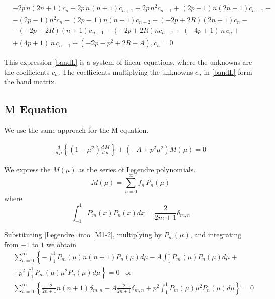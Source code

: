 \begin{equation}\label{bandL}
\begin{split}
& -2p\,n(2n+1)c_n  + 2p\,n(n+1)c_{n+1}+2p\,n^2c_{n-1} + (2p-1)n(2n-1)c_{n-1}-  \\[.8em]
& - (2p-1)n^2c_n-(2p-1)n(n-1)c_{n-2} +(-2p+2R)(2n+1)c_n - \\[.8em]
& - (-2p+2R)(n+1)c_{n+1} - (-2p+2R)n c_{n-1} + (-4p + 1)\,n\,c_n +  \\[.8em]
&  + (4p+1)\,n\,c_{n-1} + (-2p - p^2 + 2R + A),c_ n = 0 
\end{split} 
\end{equation}

This expression \eqref{bandL} is  a system of linear equations, where the unknowns are the coefficients $ c_n $. The coefficients multiplying the unknowns $ c_n $ in \eqref{bandL} form the band matrix.


\subsection{M  Equation}

We use the same approach for the M equation.

\begin{equation}\label{M1-2}
\begin{split}
\frac{d}{d\,\mu}\left\{\left(1 - \mu^2\right)\frac{d\,M}{d\,\mu} \right\}  + \left( - A + p^2\mu^2   \right)M(\mu) = 0
\end{split}
\end{equation}

We express the $ M(\mu) $ as the series of Legendre polynomials.
\begin{equation}\label{Legendre}
M(\mu) = \sum_{n=0}^{\infty}{f_n\,P_n(\mu)}
\end{equation}
where 
\begin{equation}\label{LInt}
\int_{-1}^{1}{P_m(x)P_n(x)dx} = \frac{2}{2m+1}\delta_{m,n}
\end{equation}

Substituting \eqref{Legendre} into \eqref{M1-2}, multiplying by $ P_m(\mu) $, and integrating from $ -1 $ to $ 1 $ we obtain
\begin{equation}\label{3}
\begin{split}
& \sum_{n=0}^{\infty}\left\{-\int_{1}^{1}{P_m(\mu)n(n+1)P_n(\mu)d\mu } - A \int_{1}^{1}{P_m(\mu)P_n(\mu)d\mu } + \right. \\[.8em]
& + \left.p^2\int_{1}^{1}{P_m(\mu)\mu^2P_n(\mu)d\mu } \right\} = 0\,\,\,\text{    or } \\[.8em]
& \sum_{n=0}^{\infty}\left\{\frac{-2}{2n+1}n(n+1)\delta_{m,n} - A\frac{2}{2n+1}\delta_{m,n} + p^2\int_{1}^{1}{P_m(\mu)\mu^2P_n(\mu)d\mu } \right\}
= 0
\end{split}
\end{equation}

